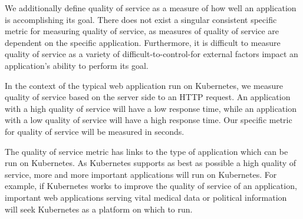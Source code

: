 We additionally define quality of service as a measure of how well an application
is accomplishing its goal. There does not exist a singular consistent specific
metric for measuring quality of service, as measures of quality of service are dependent on
the specific application. Furthermore, it is difficult to measure quality of
service as a variety of difficult-to-control-for external factors impact an
application's ability to perform its goal.

In the context of the typical web application run on Kubernetes, we measure
quality of service based on the server side
 to an HTTP request. An application
with a high quality of service will have a low response time, while an
application with a low quality of service will have a high response time. Our
specific metric for quality of service will be measured in seconds.

The quality of service metric has links to the type of application which can be
run on Kubernetes. As Kubernetes supports as best as possible a high quality of
service, more and more important applications will run on Kubernetes. For
example, if Kubernetes works to improve the quality of service of an
application, important web applications serving vital medical data or political
information will seek Kubernetes as a platform on which to run.
